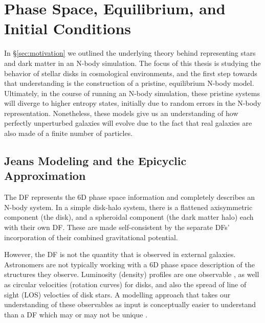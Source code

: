 \section{Phase Space, Equilibrium, and Initial Conditions} \label{sec:galaxy_ics}
In \S\ref{sec:motivation} we outlined the underlying theory behind representing stars and dark matter in an N-body simulation. The focus of this thesis is studying the behavior of stellar disks in cosmological environments, and the first step towards that understanding is the construction of a pristine, equilibrium N-body model. Ultimately, in the course of running an N-body simulation, these pristine systems will diverge to higher entropy states, initially due to random errors in the N-body representation. Nonetheless, these models give us an understanding of how perfectly unperturbed galaxies will evolve due to the fact that real galaxies are also made of a finite number of particles.

\subsection{Jeans Modeling and the Epicyclic Approximation}

The DF represents the 6D phase space information and completely describes an N-body system. In a simple disk-halo system, there is a flattened axisymmetric component (the disk), and a spheroidal component (the dark matter halo) each with their own DF. These are made self-consistent by the separate DFs' incorporation of their combined gravitational potential. 

However, the DF is not the quantity that is observed in external galaxies. Astronomers are not typically working with a 6D phase space description of the structures they observe. Luminosity (density) profiles are one observable , as well as circular velocities (rotation curves) for disks, and also the spread of line of sight (LOS) velocties of disk stars. A modelling approach that takes our understanding of these observables as input is conceptually easier to understand than a DF which may or may not be unique \citep{BT}.

